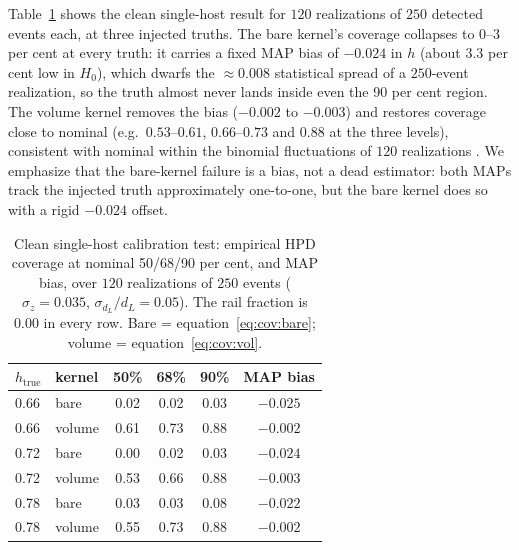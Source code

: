 Table~\ref{tab:pp-clean} shows the clean single-host result for $120$ realizations of $250$ detected events each, at three injected truths. %
The bare kernel's coverage collapses to $0$--$3$ per cent at every truth: it carries a fixed MAP bias of $-0.024$ in $h$ (about $3.3$ per cent low in $H_0$), which dwarfs the $\approx 0.008$ statistical spread of a $250$-event realization, so the truth almost never lands inside even the 90 per cent region. %
The volume kernel removes the bias ($-0.002$ to $-0.003$) and restores coverage close to nominal (e.g.\ $0.53$--$0.61$, $0.66$--$0.73$ and $0.88$ at the three levels), consistent with nominal within the binomial fluctuations of $120$ realizations \citep{Wilson:1927}. %
We emphasize that the bare-kernel failure is a bias, not a dead estimator: both MAPs track the injected truth approximately one-to-one, but the bare kernel does so with a rigid $-0.024$ offset. %

\begin{table}
  \centering
  \caption{Clean single-host calibration test: empirical HPD coverage at nominal 50/68/90 per cent, and MAP bias, over $120$ realizations of $250$ events ($\sigma_z = 0.035$, $\sigma_{d_L}/d_L = 0.05$). The rail fraction is $0.00$ in every row. Bare = equation~\eqref{eq:cov:bare}; volume = equation~\eqref{eq:cov:vol}.}
  \label{tab:pp-clean}
  \begin{tabular}{llcccc}
    \hline
    $h_{\mathrm{true}}$ & kernel & 50\% & 68\% & 90\% & MAP bias \\
    \hline
    0.66 & bare   & 0.02 & 0.02 & 0.03 & $-0.025$ \\
    0.66 & volume & 0.61 & 0.73 & 0.88 & $-0.002$ \\
    0.72 & bare   & 0.00 & 0.02 & 0.03 & $-0.024$ \\
    0.72 & volume & 0.53 & 0.66 & 0.88 & $-0.003$ \\
    0.78 & bare   & 0.03 & 0.03 & 0.08 & $-0.022$ \\
    0.78 & volume & 0.55 & 0.73 & 0.88 & $-0.002$ \\
    \hline
  \end{tabular}
\end{table}

